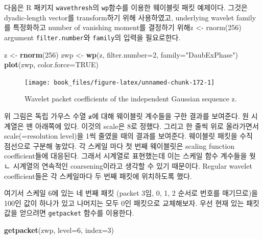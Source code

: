 \documentclass[b5paper,]{scrbook}
\makeatletter
\newenvironment{Shaded}{\begin{snugshade}}{\end{snugshade}}
\newcommand{\KeywordTok}[1]{\textcolor[rgb]{0.13,0.29,0.53}{\textbf{{#1}}}}
\newcommand{\DataTypeTok}[1]{\textcolor[rgb]{0.13,0.29,0.53}{{#1}}}
\newcommand{\DecValTok}[1]{\textcolor[rgb]{0.00,0.00,0.81}{{#1}}}
\newcommand{\StringTok}[1]{\textcolor[rgb]{0.31,0.60,0.02}{{#1}}}
\newcommand{\OtherTok}[1]{\textcolor[rgb]{0.56,0.35,0.01}{{#1}}}
\newcommand{\NormalTok}[1]{{#1}}
\theoremstyle{plain}
\theoremstyle{definition}
\numberwithin{equation}{section}
\newenvironment{kframe}{%
\medskip{}
\setlength{\fboxsep}{.8em}
 \def\at@end@of@kframe{}%
 \ifinner\ifhmode%
  \def\at@end@of@kframe{\end{minipage}}%
  \begin{minipage}{\columnwidth}%
 \fi\fi%
 \def\FrameCommand##1{\hskip\@totalleftmargin \hskip-\fboxsep
 \colorbox{shadecolor}{##1}\hskip-\fboxsep
     \hskip-\linewidth \hskip-\@totalleftmargin \hskip\columnwidth}%
 \MakeFramed {\advance\hsize-\width
   \@totalleftmargin\z@ \linewidth\hsize
   \@setminipage}}%
 {\par\unskip\endMakeFramed%
 \at@end@of@kframe}
\renewenvironment{Shaded}{\begin{kframe}}{\end{kframe}}
\makeatother
\begin{document}
다음은 R 패키지 \texttt{wavethresh}의 \texttt{wp}함수를 이용한 웨이블릿
패킷 예제이다. 그것은 dyadic-length vector를 transform하기 위해
사용하였고, underlying wavelet family를 특정화하고 number of vanishing
moment를 결정하기 위해z \textless{}- rnorm(256) argument
\texttt{filter.number}와 \texttt{family}의 입력을 필요로한다.

\begin{Shaded}
\begin{Highlighting}[]
\NormalTok{z <-}\StringTok{ }\KeywordTok{rnorm}\NormalTok{(}\DecValTok{256}\NormalTok{)}
\NormalTok{zwp <-}\StringTok{ }\KeywordTok{wp}\NormalTok{(z, }\DataTypeTok{filter.number=}\DecValTok{2}\NormalTok{, }\DataTypeTok{family=}\StringTok{"DaubExPhase"}\NormalTok{)}
\KeywordTok{plot}\NormalTok{(zwp, }\DataTypeTok{color.force=}\OtherTok{TRUE}\NormalTok{)}
\end{Highlighting}
\end{Shaded}

\begin{figure}

{\centering \texttt{[image: book\_files/figure-latex/unnamed-chunk-172-1]} 

}

\caption{Wavelet packet coefficients of the independent Gaussian sequence z.}\label{fig:unnamed-chunk-172}
\end{figure}

위 그림은 독립 가우스 수열 \(\mathbf{z}\)에 대해 웨이블릿 계수들을 구한
결과를 보여준다. 원 시계열은 맨 아래쪽에 있다. 이것의 scale은 8로
정했다. 그리고 한 줄씩 위로 올라가면서 scale(=resolution level)을 1씩
줄였을 때의 결과를 보여준다. 웨이블릿 패킷을 수직 점선으로 구분해
놓았다. 각 스케일 마다 첫 번째 웨이블릿은 scaling function
coefficient들에 대응된다. 그래서 시계열로 표현했는데 이는 스케일 함수
계수들을 웟ㄴ 시계열의 연속적인 coarsening이라고 생각할 수 있기
때문이다. Regular wavelet coefficient들은 각 스케일마다 두 번째 패킷에
위치하도록 했다.

여기서 스케일 6에 있는 네 번째 패킷 (packet 3임, 0, 1, 2 순서로 번호를
매기므로)을 100인 값이 하나가 있고 나머지는 모두 0인 패킷으로
교체해보자. 우선 현재 있는 패킷 값을 얻으려면 \texttt{getpacket} 함수를
이용한다.

\begin{Shaded}
\begin{Highlighting}[]
\KeywordTok{getpacket}\NormalTok{(zwp, }\DataTypeTok{level=}\DecValTok{6}\NormalTok{, }\DataTypeTok{index=}\DecValTok{3}\NormalTok{)}
\end{Highlighting}
\end{Shaded}
\end{document}
